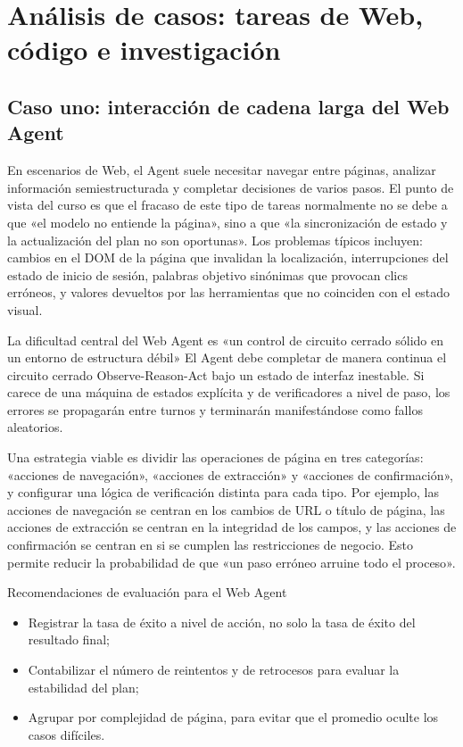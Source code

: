 \section{Análisis de casos: tareas de Web, código e investigación}

\subsection{Caso uno: interacción de cadena larga del Web Agent}
En escenarios de Web, el Agent suele necesitar navegar entre páginas, analizar información semiestructurada y completar decisiones de varios pasos. El punto de vista del curso es que el fracaso de este tipo de tareas normalmente no se debe a que «el modelo no entiende la página», sino a que «la sincronización de estado y la actualización del plan no son oportunas». Los problemas típicos incluyen: cambios en el DOM de la página que invalidan la localización, interrupciones del estado de inicio de sesión, palabras objetivo sinónimas que provocan clics erróneos, y valores devueltos por las herramientas que no coinciden con el estado visual.

\begin{importantbox}{La dificultad central del Web Agent es «un control de circuito cerrado sólido en un entorno de estructura débil»}
El Agent debe completar de manera continua el circuito cerrado Observe-Reason-Act bajo un estado de interfaz inestable. Si carece de una máquina de estados explícita y de verificadores a nivel de paso, los errores se propagarán entre turnos y terminarán manifestándose como fallos aleatorios.
\end{importantbox}

Una estrategia viable es dividir las operaciones de página en tres categorías: «acciones de navegación», «acciones de extracción» y «acciones de confirmación», y configurar una lógica de verificación distinta para cada tipo. Por ejemplo, las acciones de navegación se centran en los cambios de URL o título de página, las acciones de extracción se centran en la integridad de los campos, y las acciones de confirmación se centran en si se cumplen las restricciones de negocio. Esto permite reducir la probabilidad de que «un paso erróneo arruine todo el proceso».

\begin{knowledgebox}{Recomendaciones de evaluación para el Web Agent}
\begin{itemize}
    \item Registrar la tasa de éxito a nivel de acción, no solo la tasa de éxito del resultado final;
    \item Contabilizar el número de reintentos y de retrocesos para evaluar la estabilidad del plan;
    \item Agrupar por complejidad de página, para evitar que el promedio oculte los casos difíciles.
\end{itemize}
\end{knowledgebox}

